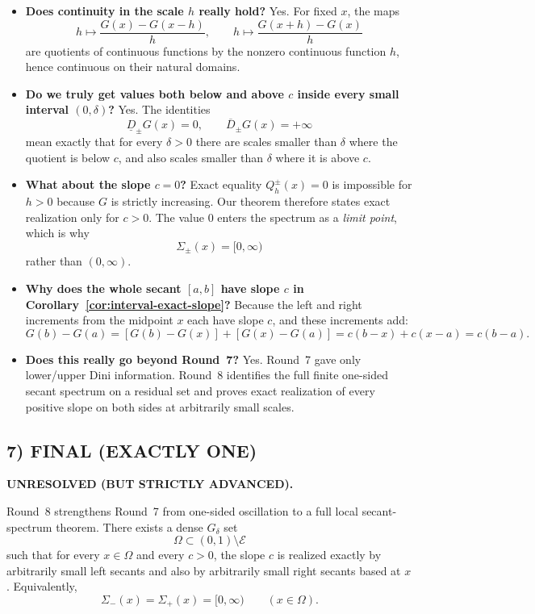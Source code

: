 \begin{itemize}
\item \textbf{Does continuity in the scale $h$ really hold?}
Yes. For fixed $x$, the maps
\[
h\mapsto \frac{G(x)-G(x-h)}{h},
\qquad
h\mapsto \frac{G(x+h)-G(x)}{h}
\]
are quotients of continuous functions by the nonzero continuous function $h$, hence continuous on their natural domains.

\item \textbf{Do we truly get values both below and above $c$ inside every small interval $(0,\delta)$?}
Yes. The identities
\[
\underline D_\pm G(x)=0,
\qquad
\overline D_\pm G(x)=+\infty
\]
mean exactly that for every $\delta>0$ there are scales smaller than $\delta$ where the quotient is below $c$, and also scales smaller than $\delta$ where it is above $c$.

\item \textbf{What about the slope $c=0$?}
Exact equality $Q_h^\pm(x)=0$ is impossible for $h>0$ because $G$ is strictly increasing. Our theorem therefore states exact realization only for $c>0$. The value $0$ enters the spectrum as a \emph{limit point}, which is why
\[
\Sigma_\pm(x)=[0,\infty)
\]
rather than $(0,\infty)$.

\item \textbf{Why does the whole secant $[a,b]$ have slope $c$ in Corollary~\ref{cor:interval-exact-slope}?}
Because the left and right increments from the midpoint $x$ each have slope $c$, and these increments add:
\[
G(b)-G(a)=[G(b)-G(x)]+[G(x)-G(a)]=c(b-x)+c(x-a)=c(b-a).
\]

\item \textbf{Does this really go beyond Round~7?}
Yes. Round~7 gave only lower/upper Dini information. Round~8 identifies the full finite one-sided secant spectrum on a residual set and proves exact realization of every positive slope on both sides at arbitrarily small scales.
\end{itemize}

\subsection{7) FINAL (EXACTLY ONE)}

\textbf{UNRESOLVED (BUT STRICTLY ADVANCED).}

Round~8 strengthens Round~7 from one-sided oscillation to a full local secant-spectrum theorem. There exists a dense $G_\delta$ set
\[
\Omega\subset(0,1)\setminus\mathcal E
\]
such that for every $x\in\Omega$ and every $c>0$, the slope $c$ is realized exactly by arbitrarily small left secants and also by arbitrarily small right secants based at $x$. Equivalently,
\[
\Sigma_-(x)=\Sigma_+(x)=[0,\infty)
\qquad(x\in\Omega).
\]

